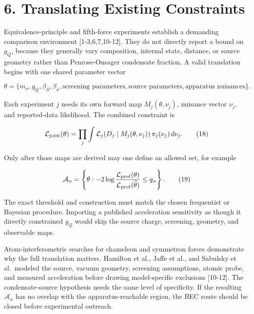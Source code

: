 \documentclass[
  american,
  11pt,
  letterpaper,
]{article}
\begin{document}
\section{6. Translating Existing Constraints}\label{translating-existing-constraints}

Equivalence-principle and fifth-force experiments establish a demanding comparison environment {[}1-3,6,7,10-12{]}. They do not directly report a bound on \(g_Q\), because they generally vary composition, internal state, distance, or source geometry rather than Penrose-Onsager condensate fraction. A valid translation begins with one shared parameter vector

\begin{equation}
\theta
=\{m_\sigma,g_Q,\beta_S,\beta_\sigma,
\text{screening parameters},\text{source parameters},
\text{apparatus nuisances}\}.
\tag{17}
\end{equation}

Each experiment \(j\) needs its own forward map \(M_j(\theta,\nu_j)\), nuisance vector \(\nu_j\), and reported-data likelihood. The combined constraint is

\begin{equation}
\mathcal L_{\rm joint}(\theta)
=\prod_j\int
\mathcal L_j\!\left(D_j\mid M_j(\theta,\nu_j)\right)
\pi_j(\nu_j)\,d\nu_j .
\tag{18}
\end{equation}

Only after those maps are derived may one define an allowed set, for example

\begin{equation}
\mathcal A_\alpha
=\left\{\theta:
-2\log\frac{\mathcal L_{\rm prof}(\theta)}
{\mathcal L_{\rm prof}(\widehat\theta)}
\le q_\alpha\right\}.
\tag{19}
\end{equation}

The exact threshold and construction must match the chosen frequentist or Bayesian procedure. Importing a published acceleration sensitivity as though it directly constrained \(g_Q\) would skip the source charge, screening, geometry, and observable maps.

Atom-interferometric searches for chameleon and symmetron forces demonstrate why the full translation matters. Hamilton et al., Jaffe et al., and Sabulsky et al.~modeled the source, vacuum geometry, screening assumptions, atomic probe, and measured acceleration before drawing model-specific exclusions {[}10-12{]}. The condensate-source hypothesis needs the same level of specificity. If the resulting \(\mathcal A_\alpha\) has no overlap with the apparatus-reachable region, the BEC route should be closed before experimental outreach.
\end{document}
